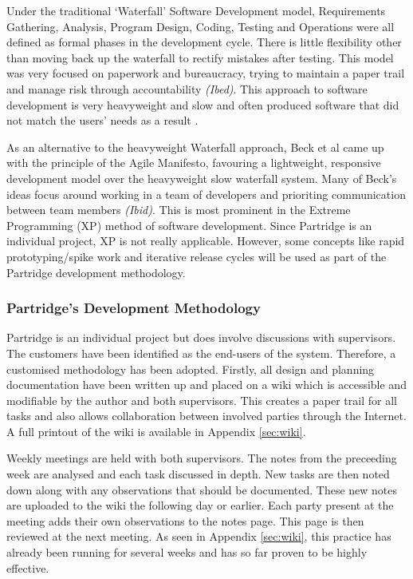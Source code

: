 \documentclass[12pt,a4paper]{article}
\begin{document}
Under the traditional `Waterfall' Software Development model, Requirements
Gathering, Analysis, Program Design, Coding, Testing and Operations were all
defined as formal phases in the development cycle. There is little flexibility
other than moving back up the waterfall to rectify mistakes after
testing\cite{Royce:1987:MDL:41765.41801}. This model was very focused on
paperwork and bureaucracy, trying to maintain a paper trail and manage risk
through accountability \emph{(Ibed)}. This approach to software development is
very heavyweight and slow and often produced software that did not match the
users' needs as a result \cite{Boehm1988}.

As an alternative to the heavyweight Waterfall approach, Beck et al came up
with the principle of the Agile Manifesto, favouring a lightweight, responsive
development model over the heavyweight slow waterfall
system\cite{beck2001agile}. Many of Beck's ideas focus around working in a team
of developers and prioriting communication between team members \emph{(Ibid)}.
This is most prominent in the Extreme Programming (XP) method of software
development. Since Partridge is an individual project, XP is not really
applicable. However, some concepts like rapid prototyping/spike work and
iterative release cycles will be used as part of the Partridge development
methodology.

\subsubsection{ Partridge's Development Methodology}

Partridge is an individual project but does involve discussions with
supervisors. The customers have been identified as the end-users of the system.
Therefore, a customised methodology has been adopted. Firstly, all design and
planning documentation have been written up and placed on a wiki which is
accessible and modifiable by the author and both supervisors. This creates a
paper trail for all tasks and also allows collaboration between involved
parties through the Internet. A full printout of the wiki is available in
Appendix \ref{sec:wiki}. 

Weekly meetings are held with both supervisors. The notes from the preceeding
week are analysed and each task discussed in depth. New tasks are then noted
down along with any observations that should be documented. These new notes are
uploaded to the wiki the following day or earlier. Each party present at the
meeting adds their own observations to the notes page. This page is then
reviewed at the next meeting. As seen in Appendix \ref{sec:wiki}, this practice
has already been running for several weeks and has so far proven to be highly
effective.
\end{document}
